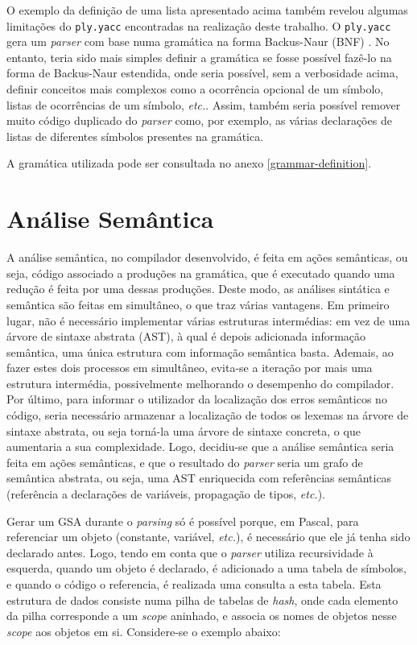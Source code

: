 \documentclass[12pt, a4paper]{article}
\begin{document}
O exemplo da definição de uma lista apresentado acima também revelou algumas limitações do
\texttt{ply.yacc} encontradas na realização deste trabalho. O \texttt{ply.yacc} gera um
\emph{parser} com base numa gramática na forma Backus-Naur (BNF) \cite{ply}. No entanto, teria sido
mais simples definir a gramática se fosse possível fazê-lo na forma de Backus-Naur estendida, onde
seria possível, sem a verbosidade acima, definir conceitos mais complexos como a ocorrência opcional
de um símbolo, listas de ocorrências de um símbolo, \emph{etc.}. Assim, também seria possível
remover muito código duplicado do \emph{parser} como, por exemplo, as várias declarações de listas
de diferentes símbolos presentes na gramática.

A gramática utilizada pode ser consultada no anexo \ref{grammar-definition}.

\section{Análise Semântica}

A análise semântica, no compilador desenvolvido, é feita em ações semânticas, ou seja, código
associado a produções na gramática, que é executado quando uma redução é feita por uma dessas
produções. Deste modo, as análises sintática e semântica são feitas em simultâneo, o que traz várias
vantagens. Em primeiro lugar, não é necessário implementar várias estruturas intermédias: em vez de
uma árvore de sintaxe abstrata (AST), à qual é depois adicionada informação semântica, uma única
estrutura com informação semântica basta. Ademais, ao fazer estes dois processos em simultâneo,
evita-se a iteração por mais uma estrutura intermédia, possivelmente melhorando o desempenho do
compilador. Por último, para informar o utilizador da localização dos erros semânticos no código,
seria necessário armazenar a localização de todos os lexemas na árvore de sintaxe abstrata, ou seja
torná-la uma árvore de sintaxe concreta, o que aumentaria a sua complexidade. Logo, decidiu-se que a
análise semântica seria feita em ações semânticas, e que o resultado do \emph{parser} seria um grafo
de semântica abstrata, ou seja, uma AST enriquecida com referências semânticas (referência a
declarações de variáveis, propagação de tipos, \emph{etc.}).

Gerar um GSA durante o \emph{parsing} só é possível porque, em Pascal, para referenciar um objeto
(constante, variável, \emph{etc.}), é necessário que ele já tenha sido declarado antes. Logo, tendo
em conta que o \emph{parser} utiliza recursividade à esquerda, quando um objeto é declarado, é
adicionado a uma tabela de símbolos, e quando o código o referencia, é realizada uma consulta a esta
tabela. Esta estrutura de dados consiste numa pilha de tabelas de \emph{hash}, onde cada elemento da
pilha corresponde a um \emph{scope} aninhado, e associa os nomes de objetos nesse \emph{scope} aos
objetos em si. Considere-se o exemplo abaixo:
\end{document}
